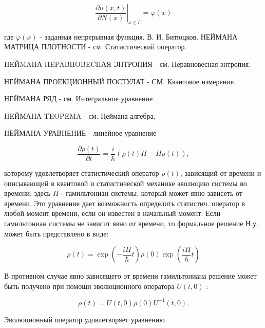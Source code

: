 \documentclass[10pt]{article}
\begin{document}
\[

\left.\frac{\partial u(x, t)}{\partial N(x)}\right|_{x \in \Gamma}=\varphi(x)

\]



где $\varphi(x)$ - заданная непрерывная функция. В. И. Битюцков. НЕЙМАНА МАТРИЦА ПЛОТНОСТИ - см. Статистический оператор.



HEЙMAHА HEPABHOBECHАЯ ЭНТРОПИЯ - см. Неравновесная энтропия.



НЕЙМАНА ПРОЕКЦИОННЫЙ ПОСТУЛАТ - СМ. Квантовое измерение.



НЕЙМАНА РЯД - см. Интегральное уравнение.



HEЙМАНА TEOPEMA - см. Неймана алгебра.



HЕЙМАНА УРАВНЕНИЕ - линейное уравнение



\[

\frac{\partial \rho(t)}{\partial t}=\frac{i}{\hbar}(\rho(t) H-H \rho(t)),

\]



которому удовлетворяет статистический оператор $\rho(t)$, зависящий от времени и описывающий в квантовой и статистической механике эволюцию системы во времени; здесь $H$ - гамильтониан системы, который может явно зависеть от времени. Это уравнение дает возможность определить статистич. оператор в любой момент времени, если он известен в начальный момент. Если гамильтониан системы не зависит явно от времени, то формальное решение Н.у. может быть представлено в виде:



\[

\rho(t)=\exp \left(-\frac{i H}{\hbar} t\right) \rho(0) \exp \left(\frac{i H}{\hbar} t\right)

\]



В противном случае явно зависящего от времени гамильтониана решение может быть получено при помощи эволюционного оператора $U(t, 0)$ :



\[

\rho(t)=U(t, 0) \rho(0) U^{-1}(t, 0) .

\]



Эволюционный оператор удовлетворяет уравнению
\end{document}
